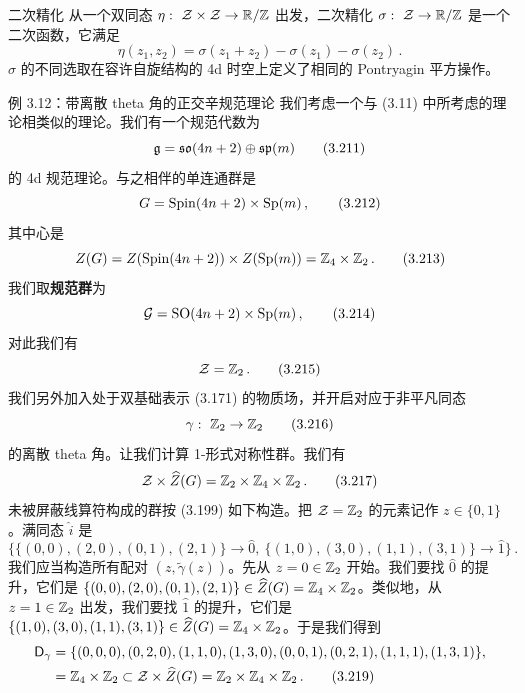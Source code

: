 \begin{notebox}{二次精化}
从一个双同态 $\eta:\ \cZ \times \cZ \to \R/\Z$ 出发，二次精化 $\sigma:\ \mathcal{Z} \to \mathbb{R}/\mathbb{Z}$ 是一个二次函数，它满足
\begin{equation}
    \eta(z_1, z_2) = \sigma(z_1 + z_2) - \sigma(z_1) - \sigma(z_2) \,.
    \tag{3.210}
\end{equation}
$\sigma$ 的不同选取在容许自旋结构的 4d 时空上定义了相同的 Pontryagin 平方操作。
\end{notebox}


\begin{examplebox}{例 3.12：带离散 theta 角的正交辛规范理论}
我们考虑一个与 (3.11) 中所考虑的理论相类似的理论。我们有一个规范代数为
\begin{equation}
    \mathfrak{g} = \mathfrak{so}(4n+2) \oplus \mathfrak{sp}(m)
    \tag{3.211}
\end{equation}
的 4d 规范理论。与之相伴的单连通群是
\begin{equation}
    G = \mathrm{Spin}(4n+2) \times \mathrm{Sp}(m) \,,
    \tag{3.212}
\end{equation}
其中心是
\begin{equation}
    Z(G) = Z(\mathrm{Spin}(4n+2)) \times Z(\mathrm{Sp}(m)) = \mathbb{Z}_4 \times \mathbb{Z}_2 \,.
    \tag{3.213}
\end{equation}
我们取\textbf{规范群}为
\begin{equation}
    \mathcal{G} = \mathrm{SO}(4n+2) \times \mathrm{Sp}(m) \,,
    \tag{3.214}
\end{equation}
对此我们有
\begin{equation}
    \mathcal{Z} = \mathbb{Z}_2 \,.
    \tag{3.215}
\end{equation}
我们另外加入处于双基础表示 (3.171) 的物质场，并开启对应于非平凡同态
\begin{equation}
    \gamma:\ \Z_2 \to \Z_2
    \tag{3.216}
\end{equation}
的离散 theta 角。让我们计算 1-形式对称性群。我们有
\begin{equation}
    \mathcal{Z} \times \widehat{Z}(G) = \mathbb{Z}_2 \times \mathbb{Z}_4 \times \mathbb{Z}_2 \,.
    \tag{3.217}
\end{equation}
未被屏蔽线算符构成的群按 (3.199) 如下构造。把 $\mathcal{Z} = \mathbb{Z}_2$ 的元素记作 $z \in \{0,1\}$。满同态 $\hat{i}$ 是
\begin{equation}
    \big\{\{(0,0),(2,0),(0,1),(2,1)\} \to \widehat{0},\ \{(1,0),(3,0),(1,1),(3,1)\} \to \widehat{1}\big\} \,.
    \tag{3.218}
\end{equation}
我们应当构造所有配对 $(z, \tilde{\gamma}(z))$。先从 $z = 0 \in \mathbb{Z}_2$ 开始。我们要找 $\widehat{0}$ 的提升，它们是 $\{(0,0),(2,0),(0,1),(2,1)\} \in \widehat{Z}(G) = \mathbb{Z}_4 \times \mathbb{Z}_2$。类似地，从 $z = 1 \in \mathbb{Z}_2$ 出发，我们要找 $\widehat{1}$ 的提升，它们是 $\{(1,0),(3,0),(1,1),(3,1)\} \in \widehat{Z}(G) = \mathbb{Z}_4 \times \mathbb{Z}_2$。于是我们得到
\begin{align}
    \mathsf{D}_\gamma &= \{(0,0,0),(0,2,0),(1,1,0),(1,3,0),(0,0,1),(0,2,1),(1,1,1),(1,3,1)\} , \nonumber \\
    &= \mathbb{Z}_4 \times \mathbb{Z}_2 \subset \mathcal{Z} \times \widehat{Z}(G) = \mathbb{Z}_2 \times \mathbb{Z}_4 \times \mathbb{Z}_2 \,.
    \tag{3.219}
\end{align}
\end{examplebox}

